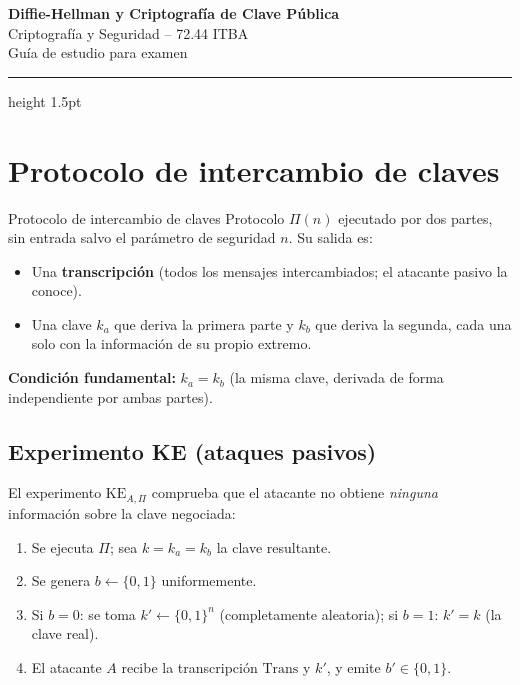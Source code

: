 \documentclass[11pt,a4paper]{article}
\begin{document}
\begin{center}
  {\LARGE\bfseries\color{mainblue} Diffie-Hellman y Criptografía de Clave Pública}\\[4pt]
  {\large Criptografía y Seguridad -- 72.44 \quad ITBA}\\[2pt]
  {\small Guía de estudio para examen}
\end{center}
\vspace{-4pt}
\hrule height 1.5pt \color{mainblue}
\vspace{8pt}

\tableofcontents
\vspace{8pt}

\section{Protocolo de intercambio de claves}

\begin{definicion}{Protocolo de intercambio de claves}
Protocolo $\Pi(n)$ ejecutado por dos partes, sin entrada salvo el parámetro de
seguridad $n$. Su salida es:
\begin{itemize}[leftmargin=1.4em,nosep]
  \item Una \textbf{transcripción} (todos los mensajes intercambiados; el atacante
  pasivo la conoce).
  \item Una clave $k_a$ que deriva la primera parte y $k_b$ que deriva la segunda,
  cada una solo con la información de su propio extremo.
\end{itemize}
\textbf{Condición fundamental:} $k_a = k_b$ (la misma clave, derivada de forma
independiente por ambas partes).
\end{definicion}

\subsection{Experimento KE (ataques pasivos)}

El experimento $\mathrm{KE}_{A,\Pi}$ comprueba que el atacante no obtiene
\emph{ninguna} información sobre la clave negociada:

\begin{enumerate}[leftmargin=1.6em,nosep]
  \item Se ejecuta $\Pi$; sea $k = k_a = k_b$ la clave resultante.
  \item Se genera $b \leftarrow \{0,1\}$ uniformemente.
  \item Si $b=0$: se toma $k' \leftarrow \{0,1\}^n$ (completamente aleatoria);\quad
        si $b=1$: $k' = k$ (la clave real).
  \item El atacante $A$ recibe la transcripción $\mathrm{Trans}$ y $k'$, y emite $b' \in \{0,1\}$.
\end{enumerate}
\end{document}
